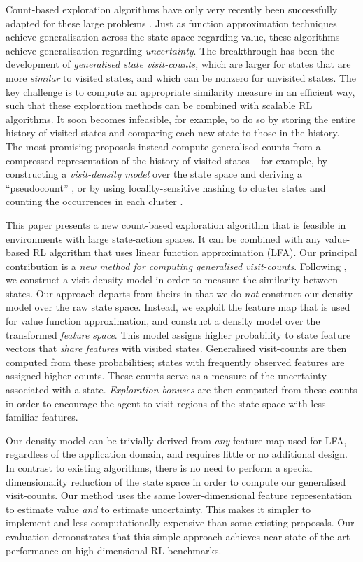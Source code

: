 \documentclass{article}
\theoremstyle{definition}
\theoremstyle{definition}
\theoremstyle{plain}
\theoremstyle{plain}
\theoremstyle{plain}
\begin{document}
Count-based exploration algorithms have only very recently been successfully
adapted for these large problems \cite{Bellemare2016,Tang2016exploration}.
Just as function approximation techniques achieve generalisation across
the state space regarding value, these algorithms achieve generalisation
regarding \emph{uncertainty}. The breakthrough has been the development
of \emph{generalised state visit-counts, }which are larger for states
that are more \emph{similar} to visited states, and which can be nonzero
for unvisited states. The key challenge is to compute an appropriate
similarity measure in an efficient way, such that these exploration
methods can be combined with scalable RL algorithms. It soon becomes
infeasible, for example, to do so by storing the entire history of
visited states and comparing each new state to those in the history.
The most promising proposals instead compute generalised counts from
a compressed representation of the history of visited states -- for
example, by constructing a \emph{visit-density model} over the state
space and deriving a ``pseudocount'' \cite{Bellemare2016,DBLP:journals/corr/OstrovskiBOM17},
or by using locality-sensitive hashing to cluster states and counting
the occurrences in each cluster \cite{Tang2016exploration}.

This paper presents a new count-based exploration algorithm that is
feasible in environments with large state-action spaces. It can be
combined with any value-based RL algorithm that uses linear function
approximation (LFA). Our principal contribution is a \emph{new method
for computing generalised visit-counts}. Following \cite{Bellemare2016},
we construct a visit-density model in order to measure the similarity
between states. Our approach departs from theirs in that we do \emph{not}
construct our density model over\emph{ }the raw state space. Instead,
we exploit the feature map that is used for value function approximation,
and construct a density model over the transformed \emph{feature space}.
This model assigns higher probability to state feature vectors that
\emph{share features} with visited states. Generalised visit-counts
are then computed from these probabilities; states with frequently
observed features are assigned higher counts. These counts serve as
a measure of the uncertainty associated with a state. \emph{Exploration
bonuses} are then computed from these counts in order to encourage
the agent to visit regions of the state-space with less familiar features.

Our density model can be trivially derived from \emph{any }feature
map used for LFA, regardless of the application domain, and requires
little or no additional design. In contrast to existing algorithms,
there is no need to perform a special dimensionality reduction of
the state space in order to compute our generalised visit-counts.
Our method uses the same lower-dimensional feature representation
to estimate value \emph{and }to estimate uncertainty. This makes it
simpler to implement and less computationally expensive than some
existing proposals. Our evaluation demonstrates that this simple approach
achieves near state-of-the-art performance on high-dimensional RL
benchmarks.
\end{document}

